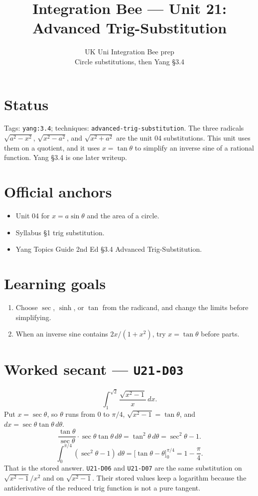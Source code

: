 
\title{Integration Bee --- Unit 21:\\ Advanced Trig-Substitution}
\author{UK Uni Integration Bee prep\\ Circle substitutions, then Yang \S3.4}
\date{}

\maketitle
\section*{Status}
Tags: \texttt{yang:3.4}; techniques: \texttt{advanced-trig-substitution}.
The three radicals $\sqrt{a^2-x^2}$, $\sqrt{x^2-a^2}$, and $\sqrt{x^2+a^2}$ are the unit 04 substitutions. This unit uses them on a quotient, and it uses $x=\tan\theta$ to simplify an inverse sine of a rational function. Yang \S3.4 is one later writeup.
\section{Official anchors}
\begin{itemize}
\item Unit 04 for $x=a\sin\theta$ and the area of a circle.
\item Syllabus \S1 trig substitution.
\item Yang Topics Guide 2nd Ed \S3.4 Advanced Trig-Substitution.
\end{itemize}
\section{Learning goals}
\begin{enumerate}
  \item Choose $\sec$, $\sinh$, or $\tan$ from the radicand, and change the limits before simplifying.
  \item When an inverse sine contains $2x/(1+x^2)$, try $x=\tan\theta$ before parts.
\end{enumerate}

\section{Worked secant --- \texttt{U21-D03}}
\[
\int_1^{\sqrt{2}}\frac{\sqrt{x^2-1}}{x}\,dx.
\]
Put $x=\sec\theta$, so $\theta$ runs from $0$ to $\pi/4$, $\sqrt{x^2-1}=\tan\theta$, and $dx=\sec\theta\tan\theta\,d\theta$.
\[
\frac{\tan\theta}{\sec\theta}\cdot\sec\theta\tan\theta\,d\theta=\tan^2\theta\,d\theta=\sec^2\theta-1.
\]
\[
\int_0^{\pi/4}(\sec^2\theta-1)\,d\theta=\bigl[\tan\theta-\theta\bigr]_0^{\pi/4}=1-\frac\pi4.
\]
That is the stored answer. \texttt{U21-D06} and \texttt{U21-D07} are the same substitution on $\sqrt{x^2-1}/x^2$ and on $\sqrt{x^2-1}$. Their stored values keep a logarithm because the antiderivative of the reduced trig function is not a pure tangent.

